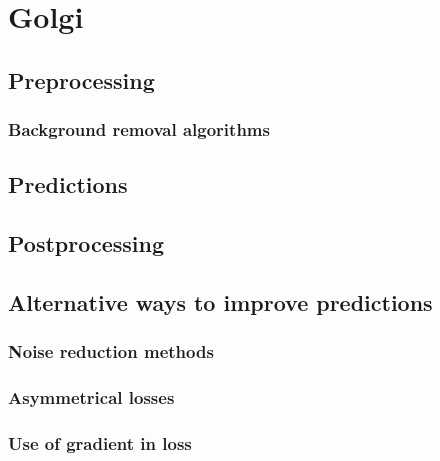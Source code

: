 \section{Golgi}
    \subsection{Preprocessing}
        
        \subsubsection{Background removal algorithms}
        
    \subsection{Predictions}
    \subsection{Postprocessing}
    \subsection{Alternative ways to improve predictions}
        \subsubsection{Noise reduction methods}
        \subsubsection{Asymmetrical losses}
        \subsubsection{Use of gradient in loss}
